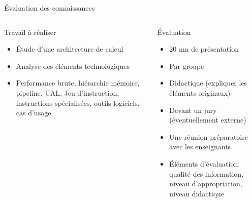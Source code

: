 %
\begin{Frame}{Évaluation des connaissances}
  \begin{columns}[t]
    \begin{column}{.45\textwidth} %
      \begin{block}{Travail à réaliser}
        \begin{itemize}
        \item Étude d'une architecture de calcul
        \item Analyse des éléments technologiques
        \item Performance brute, hiérarchie mémoire, pipeline, UAL,
          Jeu d'instruction, instructions spécialisées, outils
          logiciels, cas d'usage
        \end{itemize}
      \end{block} 
    \end{column}
    
    \begin{column}{.45\textwidth} %
      \begin{block}{Évaluation}
        \begin{itemize}
        \item 20 mn de présentation
        \item Par groupe
        \item Didactique (expliquer les éléments originaux)
        \item Devant un jury (éventuellement externe)
        \item Une réunion préparatoire avec les enseignants
        \item Éléments d'évaluation: qualité des information, niveau
          d'appropriation, niveau didactique
        \end{itemize}
      \end{block}   
    \end{column}
  \end{columns}  
\end{Frame}


